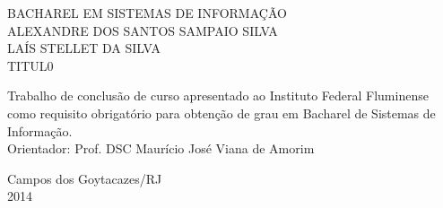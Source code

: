 \begin{titlepage}
 \begin{figure}[ht]
 \centering
 \end{figure}
 \begin{center}
   {\large BACHAREL EM SISTEMAS DE INFORMAÇÃO} \\ [3.5cm]
   {\large ALEXANDRE DOS SANTOS SAMPAIO SILVA} \\ [1cm]
   {\large LAÍS STELLET DA SILVA} \\ [2cm]
   {\large TITUL0 } \\[3cm]
   \hspace{.45\textwidth} %
   \begin{minipage}{0.5\textwidth}
   \begin{espacosimples}
        Trabalho de conclusão de curso apresentado ao Instituto Federal Fluminense como requisito obrigatório para obtenção de grau em Bacharel de Sistemas de Informação.\\[1.5cm]
        Orientador: Prof. DSC Maurício José Viana de Amorim\\
    \end{espacosimples}
    \end{minipage}
   \vfill
   {\large Campos dos Goytacazes/RJ} \\
   {\large 2014}
 \end{center}
\end{titlepage}

